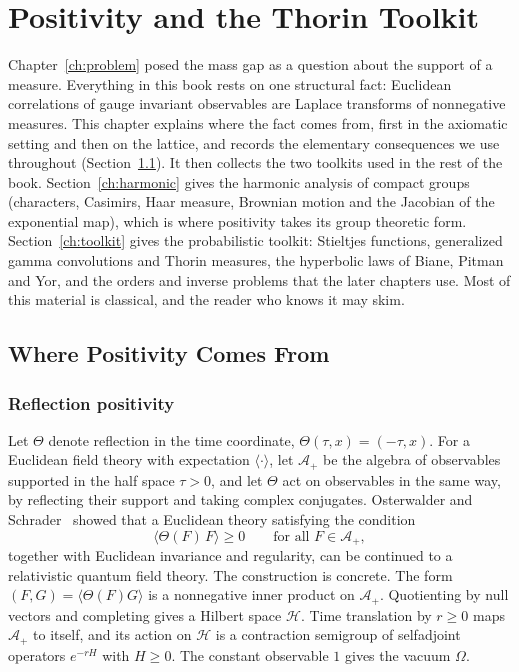 \chapter{Positivity and the Thorin Toolkit}\label{ch:positivity}

Chapter~\ref{ch:problem} posed the mass gap as a question about the support of a measure. Everything in this book rests on one structural fact: Euclidean correlations of gauge invariant observables are Laplace transforms of nonnegative measures. This chapter explains where the fact comes from, first in the axiomatic setting and then on the lattice, and records the elementary consequences we use throughout (Section~\ref{sec:wherepos}). It then collects the two toolkits used in the rest of the book. Section~\ref{ch:harmonic} gives the harmonic analysis of compact groups (characters, Casimirs, Haar measure, Brownian motion and the Jacobian of the exponential map), which is where positivity takes its group theoretic form. Section~\ref{ch:toolkit} gives the probabilistic toolkit: Stieltjes functions, generalized gamma convolutions and Thorin measures, the hyperbolic laws of Biane, Pitman and Yor, and the orders and inverse problems that the later chapters use. Most of this material is classical, and the reader who knows it may skim.

\section{Where Positivity Comes From}\label{sec:wherepos}

\subsection{Reflection positivity}

Let $\Theta$ denote reflection in the time coordinate, $\Theta(\tau,x)=(-\tau,x)$. For a Euclidean field theory with expectation $\langle\cdot\rangle$, let $\mathcal A_+$ be the algebra of observables supported in the half space $\tau>0$, and let $\Theta$ act on observables in the same way, by reflecting their support and taking complex conjugates. Osterwalder and Schrader~\cite{OS} showed that a Euclidean theory satisfying the condition
\begin{equation}\label{eq:RP}
\langle\Theta(F)\,F\rangle\ge0\qquad\text{for all }F\in\mathcal A_+,
\end{equation}
together with Euclidean invariance and regularity, can be continued to a relativistic quantum field theory. The construction is concrete. The form $(F,G)=\langle\Theta(F)G\rangle$ is a nonnegative inner product on $\mathcal A_+$. Quotienting by null vectors and completing gives a Hilbert space $\mathcal H$. Time translation by $r\ge0$ maps $\mathcal A_+$ to itself, and its action on $\mathcal H$ is a contraction semigroup of selfadjoint operators $e^{-rH}$ with $H\ge0$. The constant observable $1$ gives the vacuum $\Omega$.

